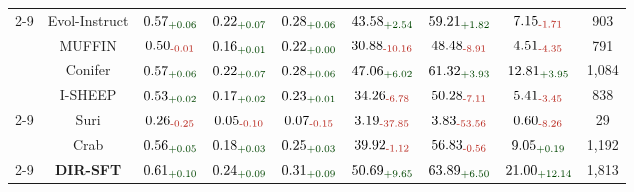 \begin{table}[pos=tbp]
{\begin{tabular}{c|c|ccc|cc|cc}
\cmidrule{2-9}
& Evol-Instruct & $\text{0.57}_{\textcolor{deepgreen}{\text{+0.06}}}$ & $\text{0.22}_{\textcolor{deepgreen}{\text{+0.07}}}$ & $\text{0.28}_{\textcolor{deepgreen}{\text{+0.06}}}$ & $\text{43.58}_{\textcolor{deepgreen}{\text{+2.54}}}$ & $\text{59.21}_{\textcolor{deepgreen}{\text{+1.82}}}$ & $\text{7.15}_{\textcolor{deepred}{\text{-1.71}}}$ & 903 \\
& MUFFIN & $\text{0.50}_{\textcolor{deepred}{\text{-0.01}}}$ & $\text{0.16}_{\textcolor{deepgreen}{\text{+0.01}}}$ & $\text{0.22}_{\textcolor{deepgreen}{\text{+0.00}}}$ & $\text{30.88}_{\textcolor{deepred}{\text{-10.16}}}$ & $\text{48.48}_{\textcolor{deepred}{\text{-8.91}}}$ & $\text{4.51}_{\textcolor{deepred}{\text{-4.35}}}$ & 791 \\
& Conifer & $\text{0.57}_{\textcolor{deepgreen}{\text{+0.06}}}$ & $\text{0.22}_{\textcolor{deepgreen}{\text{+0.07}}}$ & $\text{0.28}_{\textcolor{deepgreen}{\text{+0.06}}}$ & $\text{47.06}_{\textcolor{deepgreen}{\text{+6.02}}}$ & $\text{61.32}_{\textcolor{deepgreen}{\text{+3.93}}}$ & $\text{12.81}_{\textcolor{deepgreen}{\text{+3.95}}}$ & 1,084 \\
& I-SHEEP & $\text{0.53}_{\textcolor{deepgreen}{\text{+0.02}}}$ & $\text{0.17}_{\textcolor{deepgreen}{\text{+0.02}}}$ & $\text{0.23}_{\textcolor{deepgreen}{\text{+0.01}}}$ & $\text{34.26}_{\textcolor{deepred}{\text{-6.78}}}$ & $\text{50.28}_{\textcolor{deepred}{\text{-7.11}}}$ & $\text{5.41}_{\textcolor{deepred}{\text{-3.45}}}$ & 838 \\
\cmidrule{2-9}
& Suri & $\text{0.26}_{\textcolor{deepred}{\text{-0.25}}}$ & $\text{0.05}_{\textcolor{deepred}{\text{-0.10}}}$ & $\text{0.07}_{\textcolor{deepred}{\text{-0.15}}}$ & $\text{3.19}_{\textcolor{deepred}{\text{-37.85}}}$ & $\text{3.83}_{\textcolor{deepred}{\text{-53.56}}}$ & $\text{0.60}_{\textcolor{deepred}{\text{-8.26}}}$ & 29 \\
& Crab & $\text{0.56}_{\textcolor{deepgreen}{\text{+0.05}}}$ & $\text{0.18}_{\textcolor{deepgreen}{\text{+0.03}}}$ & $\text{0.25}_{\textcolor{deepgreen}{\text{+0.03}}}$ & $\text{39.92}_{\textcolor{deepred}{\text{-1.12}}}$ & $\text{56.83}_{\textcolor{deepred}{\text{-0.56}}}$ & $\text{9.05}_{\textcolor{deepgreen}{\text{+0.19}}}$ & 1,192 \\
\cmidrule{2-9}
& \textbf{DIR-SFT} & \textbf{$\text{0.61}_{\textcolor{deepgreen}{\text{+0.10}}}$} & \textbf{$\text{0.24}_{\textcolor{deepgreen}{\text{+0.09}}}$} & \textbf{$\text{0.31}_{\textcolor{deepgreen}{\text{+0.09}}}$} & \textbf{$\text{50.69}_{\textcolor{deepgreen}{\text{+9.65}}}$} & \textbf{$\text{63.89}_{\textcolor{deepgreen}{\text{+6.50}}}$} & \textbf{$\text{21.00}_{\textcolor{deepgreen}{\text{+12.14}}}$} & 1,813 \\

\end{tabular}}
\end{table}

